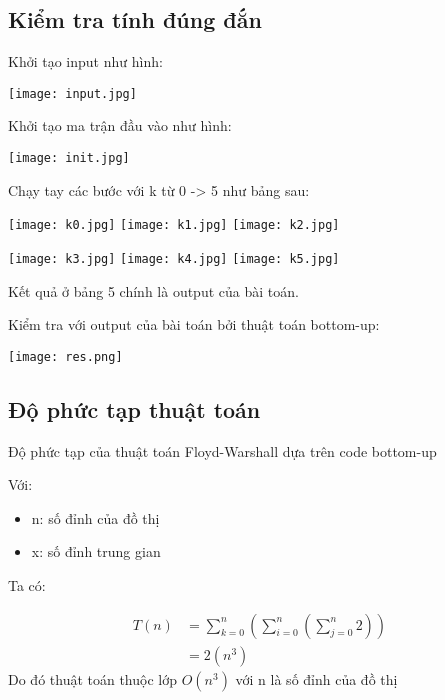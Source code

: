 \documentclass[a4paper]{article}
\begin{document}
\subsection{Kiểm tra tính đúng đắn}
Khởi tạo input như hình:

\begin{center}
    \texttt{[image: input.jpg]}
\end{center}

Khởi tạo ma trận đầu vào như hình:

\begin{center}
    \texttt{[image: init.jpg]}
    
\end{center}

Chạy tay các bước với k từ 0 -> 5 như bảng sau:

\begin{center}
    
    \texttt{[image: k0.jpg]}
    \texttt{[image: k1.jpg]}
    \texttt{[image: k2.jpg]}


    \texttt{[image: k3.jpg]}
    \texttt{[image: k4.jpg]}
    \texttt{[image: k5.jpg]}
\end{center}

Kết quả ở bảng 5 chính là output của bài toán.

Kiểm tra với output của bài toán bởi thuật toán bottom-up:

\begin{center}
    \texttt{[image: res.png]}
\end{center}

\subsection{Độ phức tạp thuật toán}
Độ phức tạp của thuật toán Floyd-Warshall dựa trên code bottom-up

Với:
\begin{itemize}
    \item n: số đỉnh của đồ thị
    \item x: số đỉnh trung gian
\end{itemize}

Ta có:

\begin{align*}
    T(n)&=\sum_{k=0}^{n}(\sum_{i=0}^{n}(\sum_{j=0}^{n}2))\\
    &= 2(n^3)
\end{align*}
Do đó thuật toán thuộc lớp $O(n^3)$ với n là số đỉnh của đồ thị
\end{document}
